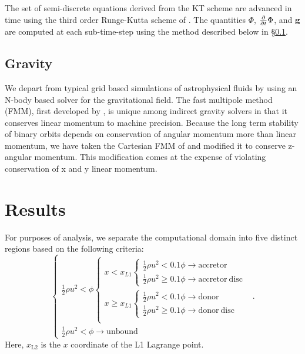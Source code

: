 \documentclass[preprint]{aastex}
\begin{document}
The set of semi-discrete equations derived from the KT scheme are advanced in time using the third order Runge-Kutta scheme of \cite{SO1988}. 
The quantities $\Phi$, $\frac{\partial}{\partial t} \Phi$, and ${\bf{g}}$ are computed at each sub-time-step using the method described below in \S \ref{gsection}.

\subsection {Gravity}
\label{gsection}
We depart from typical grid based simulations of astrophysical fluids by using an N-body based solver for the gravitational field. The fast multipole method (FMM), first developed by \cite{GR1997}, is unique among indirect gravity solvers in that it conserves linear momentum to machine precision. Because the long term stability of binary orbits depends on conservation of angular momentum more than linear momentum, we have taken the Cartesian FMM of \cite{D2000} and modified it to conserve z-angular momentum. This modification comes at the expense of violating conservation of x and y linear momentum.


\section{Results}
For purposes of analysis, we separate the computational domain into five distinct regions based on the following criteria:
\begin{equation}
\begin{cases}
      \frac{1}{2} \rho u^2 < \phi 
      \begin{cases}
          x < x_{L1}  
	  \begin{cases}
          	\frac{1}{2} \rho u^2 < 0.1 \phi  \to \mathrm{accretor} \\
          	\frac{1}{2} \rho u^2 \ge 0.1 \phi \to \mathrm{accretor \ disc}
      	  \end{cases}\\
          x \ge x_{L1}  
	  \begin{cases}
          	\frac{1}{2} \rho u^2 < 0.1 \phi  \to \mathrm{donor} \\
          	\frac{1}{2} \rho u^2 \ge 0.1 \phi \to \mathrm{donor \ disc}
      	  \end{cases}\\
      \end{cases}\\
      \frac{1}{2} \rho u^2 < \phi \to \mathrm{unbound}
\end{cases}.
\end{equation}
Here, $x_\mathrm{L2}$ is the $x$ coordinate of the L1 Lagrange point. 
\end{document}
